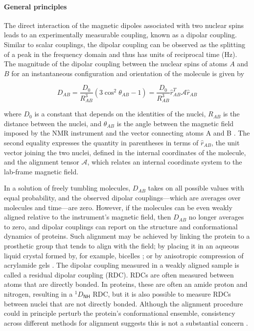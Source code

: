 \documentclass[9pt,review,pubversion]{livecoms}
\begin{document}
\paragraph{General principles}

The direct interaction of the magnetic dipoles associated with two nuclear spins leads to an experimentally measurable coupling, known as a dipolar coupling.
Similar to scalar couplings, the dipolar coupling can be observed as the splitting of a peak in the frequency domain and thus has units of reciprocal time (Hz).
The magnitude of the dipolar coupling between the nuclear spins of atoms $A$ and $B$ for an instantaneous configuration and orientation of the molecule is given by

\begin{equation}
\label{eqn:rdc}
D_{AB} = \frac {D_0} {R_{AB}^3} \left( 3 \cos^2 \theta_{AB} - 1 \right) = \frac {D_0} {R_{AB}^3} \hat{r}_{AB}^T \mathcal{A} \hat{r}_{AB}
\end{equation}

\noindent where $D_0$ is a constant that depends on the identities of the nuclei, $R_{AB}$ is the distance between the nuclei, and $\theta_{AB}$ is the angle between the magnetic field imposed by the NMR instrument and the vector connecting atoms A and B \cite{bax2001dipolar,bax2003weak,chiliveri2021advances}.
The second equality expresses the quantity in parentheses in terms of $\hat{r}_{AB}$, the unit vector joining the two nuclei, defined in the internal coordinates of the molecule, and the alignment tensor $\mathcal{A}$, which relates an internal coordinate system to the lab-frame magnetic field.

In a solution of freely tumbling molecules, $D_{AB}$ takes on all possible values with equal probability, and the observed dipolar couplings---which are averages over molecules and time---are zero.
However, if the molecules can be even weakly aligned relative to the instrument’s magnetic field, then $D_{AB}$ no longer averages to zero, and dipolar couplings can report on the structure and conformational dynamics of proteins.
Such alignment may be achieved by linking the protein to a prosthetic group that tends to align with the field; by placing it in an aqueous liquid crystal formed by, for example, bicelles \cite{sanders_magnetically_1990,prosser_magnetically_1998}; or by anisotropic compression of acrylamide gels \cite{tycko_alignment_2000}.
The dipolar coupling measured in a weakly aligned sample is called a residual dipolar coupling (RDC).
RDCs are often measured between atoms that are directly bonded.
In proteins, these are often an amide proton and nitrogen, resulting in a $^1D_{\mathsf{NH}}$ RDC, but it is also possible to measure RDCs between nuclei that are not directly bonded.
Although the alignment procedure could in principle perturb the protein’s conformational ensemble, consistency across different methods for alignment suggests this is not a substantial concern \cite{lakomek2008self}.
\end{document}
